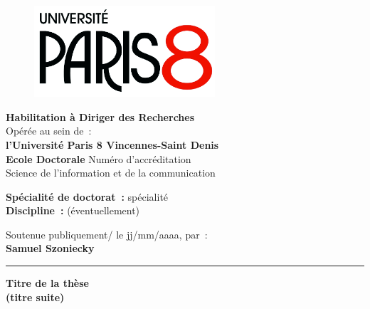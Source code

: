 
\usepackage{graphicx}
\usepackage[T1]{fontenc}
\usepackage[utf8]{inputenc}
\usepackage[french]{babel}
\DeclareOldFontCommand{\bf}{\normalfont\bfseries}{\mathbf}



\begin{titlepage}

\unitlength 1cm
\begin{center}

\vspace*{-2.5cm}
\begin{figure}[h]
    \centering
    \includegraphics[width=0.6\textwidth]{images/Logo-P8.jpg}
\end{figure}



           {\large\bf Habilitation à Diriger des Recherches\\}
           {Opérée au sein de~:\\}
           {\large \bf l'Université Paris 8 Vincennes-Saint Denis \\}
\vspace{12pt}
           {\large \textbf{Ecole Doctorale} Numéro d'accréditation \\Science de l'information et de la communication}


\vspace{12pt}

           {\large \textbf{Spécialité de doctorat~:} spécialité \\}
           {\large \textbf{Discipline~:} (éventuellement)}

\vspace{0.8cm}

           {Soutenue publiquement/ le jj/mm/aaaa, par~:\\}
           {\Large\bf {Samuel Szoniecky}}
\vspace{0.5cm}           


\rule{5cm}{1pt}

\vspace{12pt}
           
           {\LARGE \bf Titre de la thèse}\\
           \vspace{0.3cm}
           {\Large \bf (titre suite)}
           

\end{center}
\end{titlepage}
